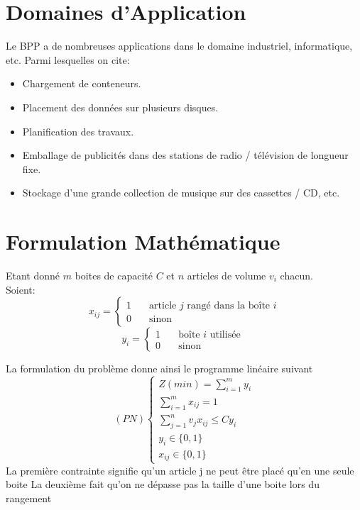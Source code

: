 \documentclass[12pt]{article}
\begin{document}
    \section{Domaines d'Application}
Le BPP a de nombreuses applications dans le domaine industriel, informatique, etc. Parmi lesquelles on cite:
    \renewcommand{\labelitemi}{$\circ$}  
    \begin{itemize}
        \item Chargement de conteneurs.
        \item Placement des données sur plusieurs disques.
        \item Planification des travaux.
        \item Emballage de publicités dans des stations de radio / télévision de longueur fixe.
        \item Stockage d’une grande collection de musique sur des cassettes / CD, etc.
    \end{itemize}
    \section{Formulation Mathématique}
    Etant donné \(m\) boites de capacité \(C\) et \(n\) articles de volume \(v_i\) chacun. \\
    Soient: 
    \[ x_{ij} =
        \begin{cases}
            1  & \quad \text{article } j \text{ rangé dans la boîte } i \\
            0  & \quad \text{sinon } 
        \end{cases}
    \]
\[ y_i =
    \begin{cases}
        1  & \quad \text{boîte } i \text{ utilisée } \\
        0  & \quad \text{sinon } 
    \end{cases}
\]

La formulation du problème donne ainsi le programme linéaire suivant
\[(PN)
    \begin{cases}
        Z(min) = \displaystyle\sum_{i=1}^{m} y_i \\
        \displaystyle\sum_{i=1}^{m} x_{ij}  = 1 \\
        \displaystyle\sum_{j=1}^{n} v_j x_{ij} \le C y_i \\
        y_i \in \{0,1\} \\
        x_{ij} \in \{0,1\} 
    \end{cases}
\]  
La première contrainte signifie qu’un article j ne peut être placé qu’en une seule boite
La deuxième fait qu’on ne dépasse pas la taille d’une boite lors du rangement
\end{document}
